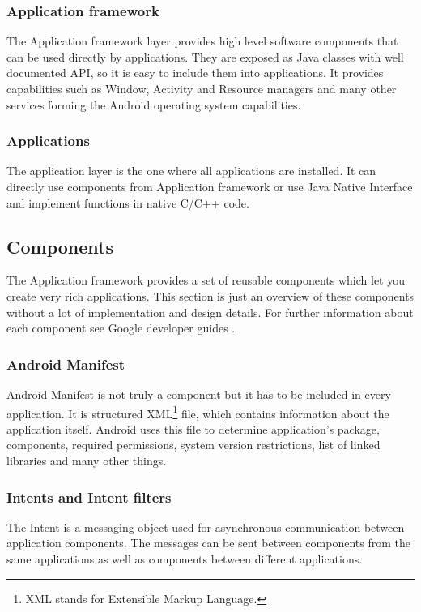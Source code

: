 \subsubsection{Application framework}
The Application framework layer provides high level software components that can be used directly by applications. They are exposed as Java classes with well documented API, so it is easy to include them into applications. It provides capabilities such as Window, Activity and Resource managers and many other services forming the Android operating system capabilities.

\subsubsection{Applications}
The application layer is the one where all applications are installed. It can directly use components from Application framework or use Java Native Interface and implement functions in native C/C++ code.



\subsection{Components}
The Application framework provides a set of reusable components which let you create very rich applications. This section is just an overview of these components without a lot of implementation and design details. For further information about each component see Google developer guides \cite{api-guide}.

\subsubsection{Android Manifest}
\label{android:manifest}
Android Manifest is not truly a component but it has to be included in every application. It is structured XML\footnote{XML stands for Extensible Markup Language.} file, which contains information about the application itself. Android uses this file to determine application's package, components, required permissions, system version restrictions, list of linked libraries and many other things.

\subsubsection{Intents and Intent filters}
The Intent is a messaging object used for asynchronous communication between application components. The messages can be sent between components from the same applications as well as components between different applications.


